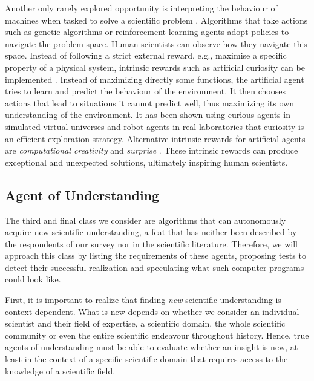  Another only rarely explored opportunity is interpreting the behaviour of machines when tasked to solve a scientific problem \cite{rahwan2019machine}. Algorithms that take actions such as genetic algorithms or reinforcement learning agents adopt policies to navigate the problem space. Human scientists can observe how they navigate this space. Instead of following a strict external reward, e.g., maximise a specific property of a physical system, intrinsic rewards such as artificial curiosity can be implemented \cite{schmidhuber2008driven,pathak2017curiosity}. Instead of maximizing directly some functions, the artificial agent tries to learn and predict the behaviour of the environment. It then chooses actions that lead to situations it cannot predict well, thus maximizing its own understanding of the environment. It has been shown using curious agents in simulated virtual universes \cite{thiede2020curiosity} and robot agents in real laboratories \cite{grizou2020curious} that curiosity is an efficient exploration strategy. Alternative intrinsic rewards for artificial agents are \textit{computational creativity}\cite{varshney2020explaining,varshney2019big} and \textit{surprise} \cite{itti2009bayesian}. These intrinsic rewards can produce exceptional and unexpected solutions, ultimately inspiring human scientists.



\subsection{Agent of Understanding}
The third and final class we consider are algorithms that can autonomously acquire new scientific understanding, a feat that has neither been described by the respondents of our survey nor in the scientific literature. Therefore, we will approach this class by listing the requirements of these agents, proposing tests to detect their successful realization and speculating what such computer programs could look like.

First, it is important to realize that finding \textit{new} scientific understanding is context-dependent. What is new depends on whether we consider an individual scientist and their field of expertise, a scientific domain, the whole scientific community or even the entire scientific endeavour throughout history. Hence, true agents of understanding must be able to evaluate whether an insight is new, at least in the context of a specific scientific domain that requires access to the knowledge of a scientific field.

